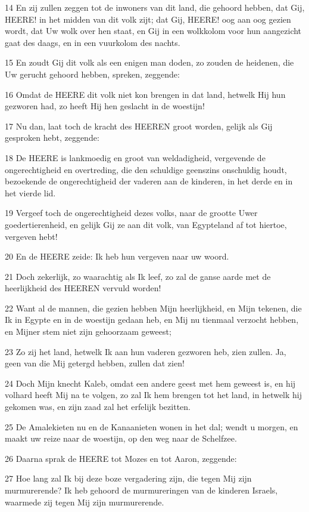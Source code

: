 \par 14 En zij zullen zeggen tot de inwoners van dit land, die gehoord hebben, dat Gij, HEERE! in het midden van dit volk zijt; dat Gij, HEERE! oog aan oog gezien wordt, dat Uw wolk over hen staat, en Gij in een wolkkolom voor hun aangezicht gaat des daags, en in een vuurkolom des nachts.
\par 15 En zoudt Gij dit volk als een enigen man doden, zo zouden de heidenen, die Uw gerucht gehoord hebben, spreken, zeggende:
\par 16 Omdat de HEERE dit volk niet kon brengen in dat land, hetwelk Hij hun gezworen had, zo heeft Hij hen geslacht in de woestijn!
\par 17 Nu dan, laat toch de kracht des HEEREN groot worden, gelijk als Gij gesproken hebt, zeggende:
\par 18 De HEERE is lankmoedig en groot van weldadigheid, vergevende de ongerechtigheid en overtreding, die den schuldige geenszins onschuldig houdt, bezoekende de ongerechtigheid der vaderen aan de kinderen, in het derde en in het vierde lid.
\par 19 Vergeef toch de ongerechtigheid dezes volks, naar de grootte Uwer goedertierenheid, en gelijk Gij ze aan dit volk, van Egypteland af tot hiertoe, vergeven hebt!
\par 20 En de HEERE zeide: Ik heb hun vergeven naar uw woord.
\par 21 Doch zekerlijk, zo waarachtig als Ik leef, zo zal de ganse aarde met de heerlijkheid des HEEREN vervuld worden!
\par 22 Want al de mannen, die gezien hebben Mijn heerlijkheid, en Mijn tekenen, die Ik in Egypte en in de woestijn gedaan heb, en Mij nu tienmaal verzocht hebben, en Mijner stem niet zijn gehoorzaam geweest;
\par 23 Zo zij het land, hetwelk Ik aan hun vaderen gezworen heb, zien zullen. Ja, geen van die Mij getergd hebben, zullen dat zien!
\par 24 Doch Mijn knecht Kaleb, omdat een andere geest met hem geweest is, en hij volhard heeft Mij na te volgen, zo zal Ik hem brengen tot het land, in hetwelk hij gekomen was, en zijn zaad zal het erfelijk bezitten.
\par 25 De Amalekieten nu en de Kanaanieten wonen in het dal; wendt u morgen, en maakt uw reize naar de woestijn, op den weg naar de Schelfzee.
\par 26 Daarna sprak de HEERE tot Mozes en tot Aaron, zeggende:
\par 27 Hoe lang zal Ik bij deze boze vergadering zijn, die tegen Mij zijn murmurerende? Ik heb gehoord de murmureringen van de kinderen Israels, waarmede zij tegen Mij zijn murmurerende.
